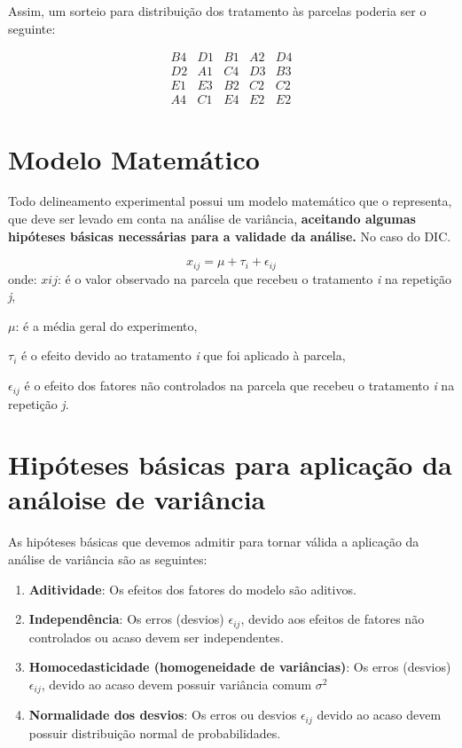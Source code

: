 \documentclass[
]{book}
\begin{document}
Assim, um sorteio para distribuição dos tratamento às parcelas poderia ser o seguinte:

\[
\begin{matrix}
B4 & D1 & B1 & A2 & D4\\
D2 & A1 & C4 & D3 & B3\\
E1 & E3 & B2 & C2 & C2\\
A4 & C1 & E4 & E2 & E2
\end{matrix}
\]

\hypertarget{modelo-matemuxe1tico}{%
\section{Modelo Matemático}\label{modelo-matemuxe1tico}}

Todo delineamento experimental possui um modelo matemático que o representa, que deve ser levado em conta na análise de variância, \textbf{aceitando algumas hipóteses básicas necessárias para a validade da análise.} No caso do DIC.

\[
x_{ij}= \mu + \tau_i + \epsilon_{ij}
\]
onde:
\(x{ij}\): é o valor observado na parcela que recebeu o tratamento \emph{i} na repetição \emph{j},

\(\mu\): é a média geral do experimento,

\(\tau_i\) é o efeito devido ao tratamento \emph{i} que foi aplicado à parcela,

\(\epsilon_{ij}\) é o efeito dos fatores não controlados na parcela que recebeu o tratamento \emph{i} na repetição \emph{j}.

\hypertarget{hipuxf3teses-buxe1sicas-para-aplicauxe7uxe3o-da-anuxe1loise-de-variuxe2ncia}{%
\section{Hipóteses básicas para aplicação da análoise de variância}\label{hipuxf3teses-buxe1sicas-para-aplicauxe7uxe3o-da-anuxe1loise-de-variuxe2ncia}}

As hipóteses básicas que devemos admitir para tornar válida a aplicação da análise de variância são as seguintes:

\begin{enumerate}
\def\labelenumi{\arabic{enumi})}
\item
  \textbf{Aditividade}: Os efeitos dos fatores do modelo são aditivos.
\item
  \textbf{Independência}: Os erros (desvios) \(\epsilon_{ij}\), devido aos efeitos de fatores não controlados ou acaso devem ser independentes.
\item
  \textbf{Homocedasticidade (homogeneidade de variâncias)}: Os erros (desvios) \(\epsilon_{ij}\), devido ao acaso devem possuir variância comum \(\sigma^2\)
\item
  \textbf{Normalidade dos desvios}: Os erros ou desvios \(\epsilon_{ij}\) devido ao acaso devem possuir distribuição normal de probabilidades.
\end{enumerate}
\end{document}
